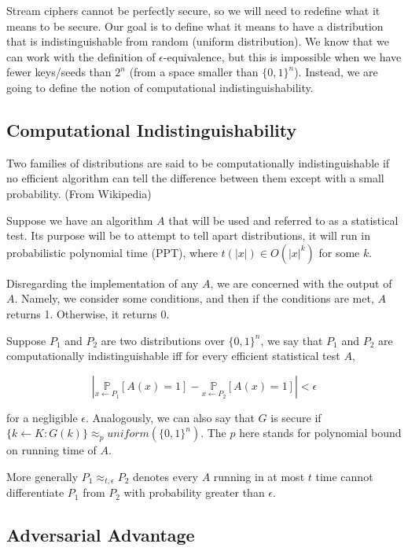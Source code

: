 \documentclass{article}
\begin{document}
\begin{multicols}{2}
Stream ciphers cannot be perfectly secure, so we will need to redefine what it means to be secure. Our goal is to define what it means to have a distribution that is indistinguishable from random (uniform distribution). We know that we can work with the definition of $\epsilon$-equivalence, but this is impossible when we have fewer keys/seeds than $2^n$ (from a space smaller than $\{0,1\}^n$). Instead, we are going to define the notion of computational indistinguishability.

\subsection {Computational Indistinguishability}

Two families of distributions are said to be computationally indistinguishable if no efficient algorithm can tell the difference between them except with a small probability. (From Wikipedia)

Suppose we have an algorithm $A$ that will be used and referred to as a statistical test. Its purpose will be to attempt to tell apart distributions, it will run in probabilistic polynomial time (PPT), where $t(|x|) \in O(|x|^k)$ for some $k$.

Disregarding the implementation of any $A$, we are concerned with the output of $A$. Namely, we consider some conditions, and then if the conditions are met, $A$ returns 1. Otherwise, it returns 0.

Suppose $P_1$ and $P_2$ are two distributions over $\{0,1\}^n$, we say that $P_1$ and $P_2$ are computationally indistinguishable iff for every efficient statistical test $A$,

$$
|\underset{x \leftarrow P_1}{\mathbb{P}}[A(x) = 1] - \underset{x \leftarrow P_2}{\mathbb{P}}[A(x) = 1]| < \epsilon
$$

for a negligible $\epsilon$. Analogously, we can also say that $G$ is secure if $\{k \leftarrow K : G(k)\} \approx_p uniform(\{0,1\}^n)$. The $p$ here stands for polynomial bound on running time of $A$.

More generally $P_1 \approx_{t,\epsilon} P_2$ denotes every $A$ running in at most $t$ time cannot differentiate $P_1$ from $P_2$ with probability greater than $\epsilon$.

\subsection {Adversarial Advantage}


\end{multicols}
\end{document}
